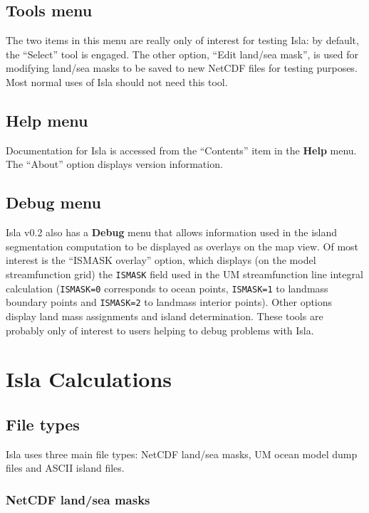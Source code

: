 \documentclass[11pt,makeidx,texhelp]{report}
\begin{document}
\section{Tools menu}

The two items in this menu are really only of interest for testing
Isla: by default, the ``Select'' tool is engaged.  The other option,
``Edit land/sea mask'', is used for modifying land/sea masks to be
saved to new NetCDF files for testing purposes.  Most normal uses of
Isla should not need this tool.

\section{Help menu}

Documentation for Isla is accessed from the ``Contents'' item in the
\textbf{Help} menu.  The ``About'' option displays version
information.

\section{Debug menu}

Isla v0.2 also has a \textbf{Debug} menu that allows information used
in the island segmentation computation to be displayed as overlays on
the map view.  Of most interest is the ``ISMASK overlay'' option,
which displays (on the model streamfunction grid) the \texttt{ISMASK}
field used in the UM streamfunction line integral calculation
(\texttt{ISMASK=0} corresponds to ocean points, \texttt{ISMASK=1} to
landmass boundary points and \texttt{ISMASK=2} to landmass interior
points).  Other options display land mass assignments and island
determination.  These tools are probably only of interest to users
helping to debug problems with Isla.


\chapter{Isla Calculations}

\section{File types}

Isla uses three main file types: NetCDF land/sea masks, UM ocean model
dump files and ASCII island files.

\subsection{NetCDF land/sea masks}
\end{document}
